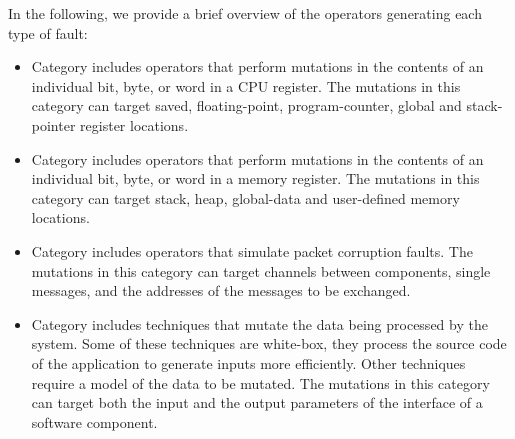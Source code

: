 In the following, we provide a brief overview of the operators generating each type of fault:
\begin{itemize}
	\item Category  includes operators that perform mutations in the contents of an individual bit, byte, or word in a CPU register. The mutations in this category can target saved, floating-point, program-counter, global and stack-pointer register locations. 
	\item Category  includes operators that perform mutations in the contents of an individual bit, byte, or word in a memory register. The mutations in this category can target stack, heap, global-data and user-defined memory locations.
	\item Category  includes operators that simulate packet corruption faults. The mutations in this category can target channels between components, single messages, and the addresses of the messages to be exchanged.
	\item Category  includes techniques that mutate the data being processed by the system. Some of these techniques are white-box, they process the source code of the application to generate inputs more efficiently. Other techniques require a model of the data to be mutated. The mutations in this category can target both the input and the output parameters of the interface of a software component.
\end{itemize}

\newcommand{\FTAPE}{\cite{tsai1999stress}}
\newcommand{\FIAT}{\cite{barton1990fault}}
\newcommand{\GOOFI}{\cite{aidemark2001goofi}}
\newcommand{\DOCTOR}{\cite{han1995doctor}}
\newcommand{\ORCHESTRA}{\cite{dawson1996testing}}
\newcommand{\Fuzz}{\cite{miller1995fuzz}}
\newcommand{\Ballista}{\cite{koopman2000exception}}
\newcommand{\RIDDLE}{\cite{ghosh1998testing}}
\newcommand{\Superion}{\cite{Wang:GrammarAwareFuzzying:ICSE:2019}}
\newcommand{\AFL}{\cite{gutmann2016fuzzing}}
\newcommand{\SAGE}{\cite{godefroid2012sage}}
\newcommand{\pFuzzer}{\cite{mathis2019parser}} 
\newcommand{\MoWF}{\cite{pham2016model}}
\newcommand{\DiNardoICST}{\cite{di2015generating}}
\newcommand{\DiNardoASE}{\cite{di2015evolutionary}}
\newcommand{\Matinnejad}{\cite{Matinnejad19}}
\newcommand{\MongoDB}{\cite{Guo:MongoDBFuzzer:CACM:2017}}
\newcommand{\SOLMI}{\cite{Jan:ISSTA:2016}}
\newcommand{\MUSQL}{\cite{Appelt:SQLI:ISSTA:2014}}


